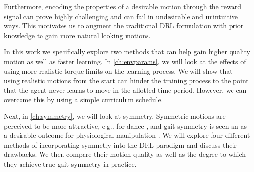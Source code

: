 Furthermore, encoding the properties of a desirable motion through the reward signal can prove highly challenging and can fail in undesirable and unintuitive ways. This motivates us to augment the traditional \ac{DRL} formulation with prior knowledge to gain more natural looking motions.

In this work we specifically explore two methods that can help gain higher quality motion as well as faster learning. In \autoref{ch:envparams}, we will look at the effects of using more realistic torque limits on the learning process. We will show that using realistic motions from the start can hinder the training process to the point that the agent never learns to move in the allotted time period. However, we can overcome this by using a simple curriculum schedule.

Next, in \autoref{ch:symmetry}, we will look at symmetry. Symmetric motions are perceived to be more attractive, e.g., for dance \cite{danceSymmetry}, and gait symmetry is seen an as a desirable outcome for physiological manipulation \cite{robinson1987use}. 
We will explore four different methods of incorporating symmetry into the \ac{DRL} paradigm and discuss their drawbacks. We then compare their motion quality as well as the degree to which they achieve true gait symmetry in practice.